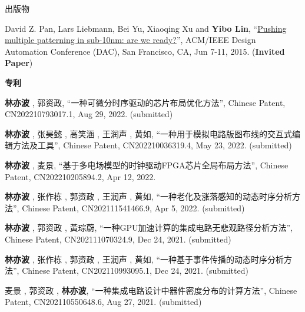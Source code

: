 \begin{rSection}{出版物}
\begin{description}[font=\normalfont, rightmargin=2em]
{}
            

\item[{[C1]}]{
        David Z. Pan, Lars Liebmann, Bei Yu, Xiaoqing Xu and \textbf{Yibo Lin}, 
    ``\href{http://dl.acm.org/citation.cfm?id=2744769.2747940}{Pushing multiple patterning in sub-10nm: are we ready?}'', 
    ACM/IEEE Design Automation Conference (DAC), San Francisco, CA, Jun 7-11, 2015.
    (\textbf{Invited Paper})
}
            

\end{description}
    

\textbf{专利}
        

\begin{description}[font=\normalfont, rightmargin=2em]
    

\item[{[P10]}]{
        \textbf{林亦波} ,  郭资政, 
    ``一种可微分时序驱动的芯片布局优化方法'', 
    Chinese Patent, CN202210793017.1, Aug 29, 2022.
    (submitted)
}
            

\item[{[P9]}]{
        \textbf{林亦波} ,  张昊懿 ,  高笑涵 ,  王润声 ,  黄如, 
    ``一种用于模拟电路版图布线的交互式编辑方法及工具'', 
    Chinese Patent, CN202210036319.4, May 23, 2022.
    (submitted)
}
            

\item[{[P8]}]{
        \textbf{林亦波} ,  麦景, 
    ``基于多电场模型的时钟驱动FPGA芯片全局布局方法'', 
    Chinese Patent, CN202210205894.2, Apr 12, 2022.
    
}
            

\item[{[P7]}]{
        \textbf{林亦波} ,  张作栋 ,  郭资政 ,  王润声 ,  黄如, 
    ``一种老化及涨落感知的动态时序分析方法'', 
    Chinese Patent, CN202111541466.9, Apr 5, 2022.
    (submitted)
}
            

\item[{[P6]}]{
        \textbf{林亦波} ,  郭资政 ,  黃琮蔚, 
    ``一种GPU加速计算的集成电路无悲观路径分析方法'', 
    Chinese Patent, CN202111070324.9, Dec 24, 2021.
    (submitted)
}
            

\item[{[P5]}]{
        \textbf{林亦波} ,  张作栋 ,  郭资政 ,  王润声 ,  黄如, 
    ``一种基于事件传播的动态时序分析方法'', 
    Chinese Patent, CN202110993095.1, Dec 24, 2021.
    (submitted)
}
            

\item[{[P4]}]{
        麦景 ,  郭资政 ,  \textbf{林亦波}, 
    ``一种集成电路设计中器件密度分布的计算方法'', 
    Chinese Patent, CN202110550648.6, Aug 27, 2021.
    (submitted)
}
            


\end{description}
\end{rSection}
